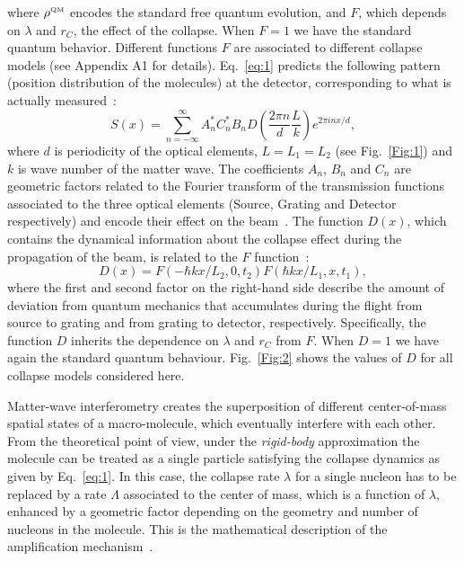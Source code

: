 \documentclass[prl,twocolumn,showpacs,superscriptaddress,groupedaddress]{revtex4}
\begin{document}
where $\rho^{\text{\tiny QM}}$ encodes the standard free quantum evolution, and $F$, which depends on $\lambda$ and $r_C$, the effect of the collapse. When $F = 1$ we have the standard quantum behavior. Different functions $F$ are associated to different collapse models  (see Appendix A1 for details). Eq.~\eqref{eq:1} predicts the following  pattern (position distribution of the molecules) at the detector, corresponding to what is actually measured~\cite{PhysRevA.70.053608, matterwave}: 
\begin{equation} \label{eq:2}
S(x) = \sum_{n = -\infty}^{\infty} A^*_n C^*_n B_n D\left( \frac{2 \pi n}{d} \frac{L}{k} \right) e^{2 \pi i n x/ d},
\end{equation}
where $d$ is periodicity of the optical elements, $L=L_1=L_2$ (see Fig.~\ref{Fig:1}) and $k$ is wave number of the matter wave. The coefficients $A_n$, $B_n$ and $C_n$ are geometric factors related to the Fourier transform of the transmission functions associated to the three optical elements (Source, Grating and Detector respectively) and encode their effect on the beam~\cite{1464-4266-5-2-362}. The function $D(x)$, which contains the dynamical information about the collapse effect during the propagation of the beam, is related to the $F$ function~\cite{PhysRevA.83.043621,matterwave}: 
\begin{equation}\label{eq:3}
D(x) = F(-\hbar kx/ L_2,0,t_2) F(\hbar kx /L_1,x,t_1), 
\end{equation}
where the first and second factor on the right-hand side describe the amount of deviation from quantum mechanics that accumulates during the flight from source to grating and from grating to detector, respectively. Specifically, the function $D$ inherits the dependence on $\lambda$ and $r_C$ from  $F$. When $D = 1$ we have again the standard quantum behaviour.  Fig.~\ref{Fig:2} shows the values of $D$ for all collapse models considered here.

Matter-wave interferometry creates the superposition of different center-of-mass spatial states of a macro-molecule, which eventually interfere with each other. From the theoretical point of view, under the {\it rigid-body} approximation the molecule can be treated as a single particle satisfying the collapse dynamics as given by Eq.~\eqref{eq:1}. In this case, the collapse rate $\lambda$ for a single nucleon has to be replaced by  a rate $\Lambda$ associated to the center of mass,  which is a function of $\lambda$, enhanced by a geometric factor depending on the geometry and number of nucleons in the molecule. This is the mathematical description of the amplification mechanism~\cite{GRW, collapse_review1,collapse_review2}.  
\end{document}
